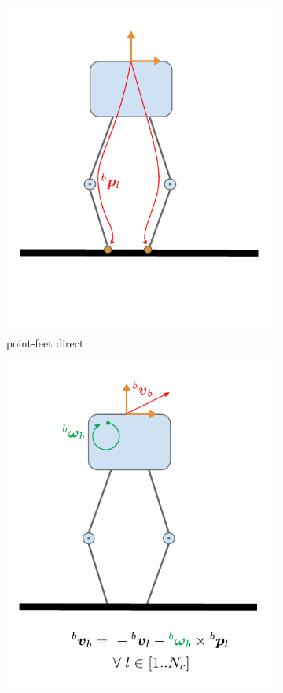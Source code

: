 \begin{figure}
\begin{subfigure}{.33\linewidth}
        \includegraphics[width=\textwidth]{figures/robot_kinematic_types_point_direct.pdf}
        \caption{point-feet direct}
    \end{subfigure}%
        \hfill
    \begin{subfigure}{.33\linewidth}
        \label{fig:kin_point_vel}
        \centering
        \includegraphics[width=\textwidth]{figures/robot_kinematic_types_point_vel.pdf}

\end{subfigure}
\end{figure}
